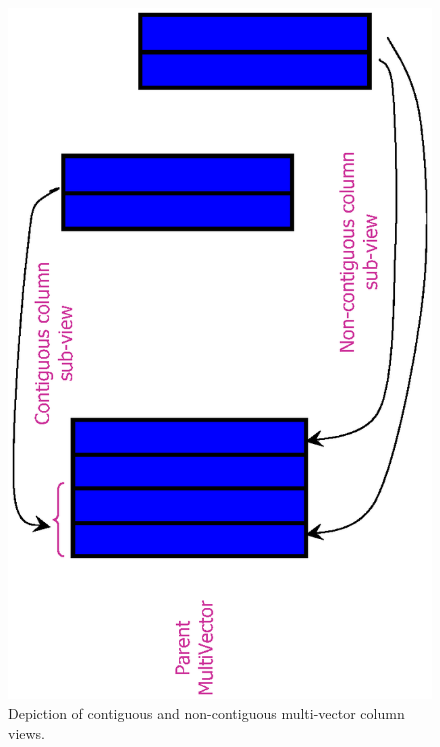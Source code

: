 \documentclass[pdf,ps2pdf,11pt]{SANDreport}
\begin{document}
{\bsinglespace
\begin{figure}
\begin{center}
\includegraphics*[angle=270,scale=0.50]{MultiVectorView}
\end{center}
\caption{
\label{fig:MultiVectorView}
Depiction of contiguous and non-contiguous multi-vector column views.}
\end{figure}
\esinglespace}
\end{document}
